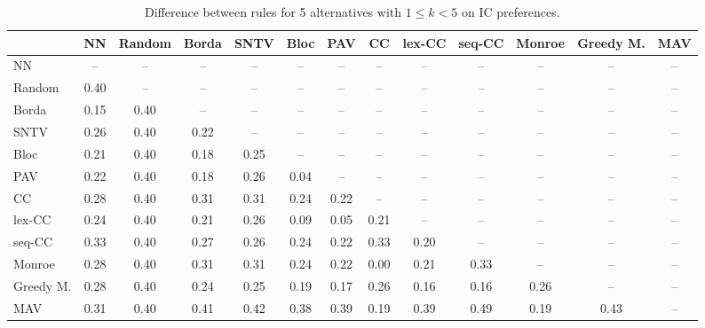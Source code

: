 
\begin{table*}[h!]
\centering
\begin{tabular}{lcccccccccccc}
\toprule
 & NN & Random & Borda & SNTV & Bloc & PAV & CC & lex-CC & seq-CC & Monroe & Greedy M. & MAV \\
\midrule
NN & -- & -- & -- & -- & -- & -- & -- & -- & -- & -- & -- & -- \\
Random & 0.40 & -- & -- & -- & -- & -- & -- & -- & -- & -- & -- & -- \\
Borda & 0.15 & 0.40 & -- & -- & -- & -- & -- & -- & -- & -- & -- & -- \\
SNTV & 0.26 & 0.40 & 0.22 & -- & -- & -- & -- & -- & -- & -- & -- & -- \\
Bloc & 0.21 & 0.40 & 0.18 & 0.25 & -- & -- & -- & -- & -- & -- & -- & -- \\
PAV & 0.22 & 0.40 & 0.18 & 0.26 & 0.04 & -- & -- & -- & -- & -- & -- & -- \\
CC & 0.28 & 0.40 & 0.31 & 0.31 & 0.24 & 0.22 & -- & -- & -- & -- & -- & -- \\
lex-CC & 0.24 & 0.40 & 0.21 & 0.26 & 0.09 & 0.05 & 0.21 & -- & -- & -- & -- & -- \\
seq-CC & 0.33 & 0.40 & 0.27 & 0.26 & 0.24 & 0.22 & 0.33 & 0.20 & -- & -- & -- & -- \\
Monroe & 0.28 & 0.40 & 0.31 & 0.31 & 0.24 & 0.22 & 0.00 & 0.21 & 0.33 & -- & -- & -- \\
Greedy M. & 0.28 & 0.40 & 0.24 & 0.25 & 0.19 & 0.17 & 0.26 & 0.16 & 0.16 & 0.26 & -- & -- \\
MAV & 0.31 & 0.40 & 0.41 & 0.42 & 0.38 & 0.39 & 0.19 & 0.39 & 0.49 & 0.19 & 0.43 & -- \\
\bottomrule
\end{tabular}

\caption{Difference between rules for 5 alternatives with $1 \leq k < 5$ on IC preferences.}
\end{table*}
